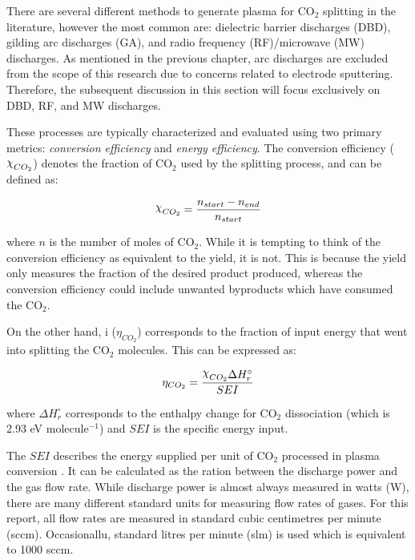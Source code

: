 There are several different methods to generate plasma for CO$_2$ splitting in the literature, however the most common are: dielectric barrier discharges (DBD), gilding arc discharges (GA), and radio frequency (RF)/microwave (MW) discharges. As mentioned in the previous chapter, arc discharges are excluded from the scope of this research due to concerns related to electrode sputtering. Therefore, the subsequent discussion in this section will focus exclusively on DBD, RF, and MW discharges.

These processes are typically characterized and evaluated using two primary metrics: \textit{conversion efficiency} and \textit{energy efficiency}. The conversion efficiency ($\rchi_{CO_2}$) denotes the fraction of CO$_2$ used by the splitting process, and can be defined as:

\begin{equation}
    \rchi_{CO_2} = \frac{n_{start} - n_{end}}{n_{start}}
\end{equation}

where $n$ is the number of moles of CO$_2$. While it is tempting to think of the conversion efficiency as equivalent to the yield, it is not. This is because the yield only measures the fraction of the desired product produced, whereas the conversion efficiency could include unwanted byproducts which have consumed the CO$_2$.

On the other hand, i ($\eta_{CO_2}$) corresponds to the fraction of input energy that went into splitting the CO$_2$ molecules. This can be expressed as:

\begin{equation}
    \eta_{CO_2} = \frac{\rchi_{CO_2} \Delta H^{\circ}_r}{SEI}
\end{equation}

where $\Delta H^{\circ}_r$ corresponds to the enthalpy change for CO$_2$ dissociation (which is 2.93 eV molecule$^{-1}$) and $SEI$ is the specific energy input. 

The $SEI$ describes the energy supplied per unit of CO$_2$ processed in plasma conversion \cite{Hegemann2023}. It can be calculated as the ration between the discharge power and the gas flow rate. While discharge power is almost always measured in watts (W), there are many different standard units for measuring flow rates of gases. For this report, all flow rates are measured in standard cubic centimetres per minute (sccm). Occasionallu, standard litres per minute (slm) is used which is equivalent to 1000 sccm.

